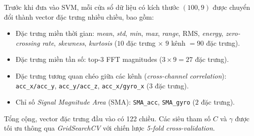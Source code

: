 \documentclass[../DoAn.tex]{subfiles}
\begin{document}
    Trước khi đưa vào SVM, mỗi cửa sổ dữ liệu có kích thước $(100, 9)$ được chuyển đổi thành vector đặc trưng nhiều chiều, bao gồm:
    \begin{itemize}
        \item Đặc trưng miền thời gian: \textit{mean}, \textit{std}, \textit{min}, \textit{max}, \textit{range}, RMS, \textit{energy}, \textit{zero-crossing rate}, \textit{skewness}, \textit{kurtosis}  
        ($10$ đặc trưng $\times$ $9$ kênh $= 90$ đặc trưng).
        
        \item Đặc trưng miền tần số: top-3 FFT magnitudes  
        ($3 \times 9 = 27$ đặc trưng).
        
        \item Đặc trưng tương quan chéo giữa các kênh (\textit{cross-channel correlation}):  
        \texttt{acc\_x/acc\_y}, \texttt{acc\_y/acc\_z}, \texttt{acc\_x/gyro\_x}  
        ($3$ đặc trưng).
        
        \item Chỉ số \textit{Signal Magnitude Area} (SMA):  
        \texttt{SMA\_acc}, \texttt{SMA\_gyro}  
        ($2$ đặc trưng).
    \end{itemize}
    
    Tổng cộng, vector đặc trưng đầu vào có 122 chiều. Các siêu tham số $C$ và $\gamma$ được tối ưu thông qua \textit{GridSearchCV} với chiến lược \textit{5-fold cross-validation}.
    
\end{document}
